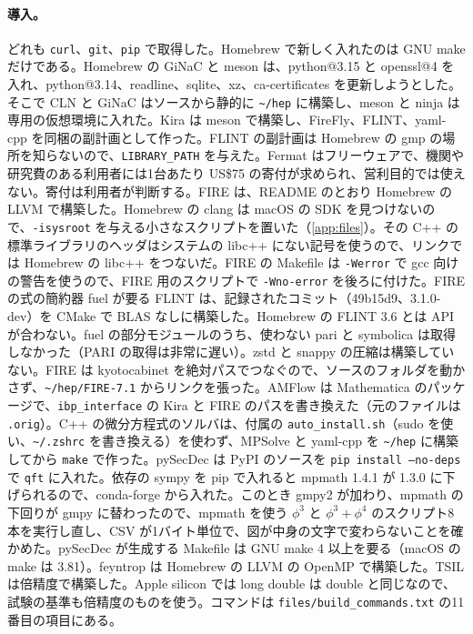 \documentclass[a4paper,10pt]{ltjsarticle}
\newcommand{\pth}[1]{\texttt{\textasciitilde/}\nolinkurl{#1}}
\begin{document}
\paragraph{導入。}どれも \texttt{curl}、\texttt{git}、\texttt{pip} で取得した。Homebrew で新しく入れたのは GNU make だけである。Homebrew の GiNaC と meson は、python@3.15 と openssl@4 を入れ、python@3.14、readline、sqlite、xz、ca-certificates を更新しようとした。そこで CLN と GiNaC はソースから静的に \pth{hep} に構築し、meson と ninja は専用の仮想環境に入れた。Kira は meson で構築し、FireFly、FLINT、yaml-cpp を同梱の副計画として作った。FLINT の副計画は Homebrew の gmp の場所を知らないので、\texttt{LIBRARY\_PATH} を与えた。Fermat はフリーウェアで、機関や研究費のある利用者には1台あたり US\$75 の寄付が求められ、営利目的では使えない。寄付は利用者が判断する。FIRE は、README のとおり Homebrew の LLVM で構築した。Homebrew の clang は macOS の SDK を見つけないので、\texttt{-isysroot} を与える小さなスクリプトを置いた（\ref{app:files}）。その C++ の標準ライブラリのヘッダはシステムの libc++ にない記号を使うので、リンクでは Homebrew の libc++ をつないだ。FIRE の Makefile は \texttt{-Werror} で gcc 向けの警告を使うので、FIRE 用のスクリプトで \texttt{-Wno-error} を後ろに付けた。FIRE の式の簡約器 fuel が要る FLINT は、記録されたコミット（49b15d9、3.1.0-dev）を CMake で BLAS なしに構築した。Homebrew の FLINT 3.6 とは API が合わない。fuel の部分モジュールのうち、使わない pari と symbolica は取得しなかった（PARI の取得は非常に遅い）。zstd と snappy の圧縮は構築していない。FIRE は kyotocabinet を絶対パスでつなぐので、ソースのフォルダを動かさず、\pth{hep/FIRE-7.1} からリンクを張った。AMFlow は Mathematica のパッケージで、\texttt{ibp\_interface} の Kira と FIRE のパスを書き換えた（元のファイルは \texttt{.orig}）。C++ の微分方程式のソルバは、付属の \texttt{auto\_install.sh}（sudo を使い、\pth{.zshrc} を書き換える）を使わず、MPSolve と yaml-cpp を \pth{hep} に構築してから \texttt{make} で作った。pySecDec は PyPI のソースを \texttt{pip install --no-deps} で \texttt{qft} に入れた。依存の sympy を pip で入れると mpmath 1.4.1 が 1.3.0 に下げられるので、conda-forge から入れた。このとき gmpy2 が加わり、mpmath の下回りが gmpy に替わったので、mpmath を使う $\phi^3$ と $\phi^3+\phi^4$ のスクリプト8本を実行し直し、CSV が1バイト単位で、図が中身の文字で変わらないことを確かめた。pySecDec が生成する Makefile は GNU make 4 以上を要る（macOS の make は 3.81）。feyntrop は Homebrew の LLVM の OpenMP で構築した。TSIL は倍精度で構築した。Apple silicon では long double は double と同じなので、試験の基準も倍精度のものを使う。コマンドは \nolinkurl{files/build_commands.txt} の11番目の項目にある。
\end{document}
